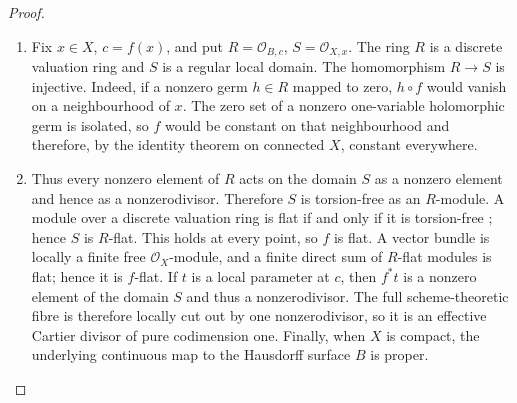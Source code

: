 \begin{proof}

\begin{enumerate}[label={$\langle1\rangle$\arabic*.},leftmargin=*]
\item Fix $x\in X$, $c=f(x)$, and put
$R=\mathcal O_{B,c}$, $S=\mathcal O_{X,x}$.  The ring $R$ is a discrete
valuation ring and $S$ is a regular local domain.  The homomorphism
$R\to S$ is injective.  Indeed, if a nonzero germ $h\in R$ mapped to zero,
$h\circ f$ would vanish on a neighbourhood of $x$.  The zero set of a
nonzero one-variable holomorphic germ is isolated, so $f$ would be constant
on that neighbourhood and therefore, by the identity theorem on connected
$X$, constant everywhere.

\item Thus every nonzero element of $R$ acts on the domain $S$ as a nonzero
element and hence as a nonzerodivisor.  Therefore $S$ is torsion-free as an
$R$-module.  A module over a discrete valuation ring is flat if and only if
it is torsion-free \cite[Tag~0AUW]{StacksProject}; hence $S$ is $R$-flat.
This holds at every point, so $f$ is flat.  A vector bundle is locally a
finite free $\mathcal O_X$-module, and a finite direct sum of $R$-flat
modules is flat; hence it is $f$-flat.  If $t$ is a local parameter at
$c$, then $f^*t$ is a nonzero element of the domain $S$ and thus a
nonzerodivisor.  The full scheme-theoretic fibre is therefore locally cut
out by one nonzerodivisor, so it is an effective Cartier divisor of pure
codimension one.  Finally, when $X$ is compact, the underlying continuous
map to the Hausdorff surface $B$ is proper.

\end{enumerate}
\end{proof}

